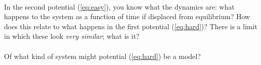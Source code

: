 \documentclass[12pt]{article}
\begin{document}
\paragraph{\theproblem}%
In the second potential (\ref{eq:easy}), you know what the dynamics
are: what happens to the system as a function of time if displaced
from equilibrium?  How does this relate to what happens in the first
potential (\ref{eq:hard})?  There is a limit in which these look
\emph{very similar}; what is it?

\paragraph{\theproblem}%
Of what kind of system might potential (\ref{eq:hard}) be a model?
\end{document}

